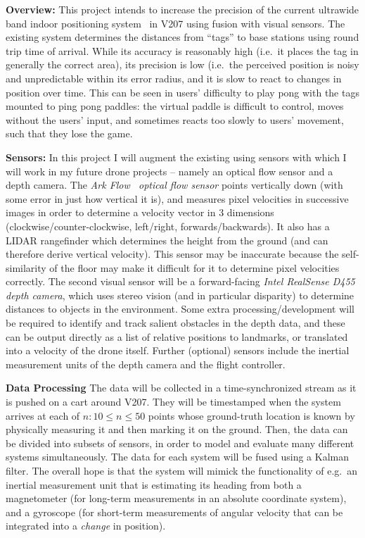 \textbf{Overview:}
This project intends to increase the precision of the current ultrawide band indoor positioning system~\cite{decawave_product_brief}
in V207 using fusion with visual sensors.
The existing system determines the distances from ``tags'' to base stations using round trip
time of arrival.
While its accuracy is reasonably high (i.e.~it places the tag in generally the correct area),
its precision is low (i.e.~the perceived position is noisy and unpredictable within its error radius,
and it is slow to react to changes in position over time.
This can be seen in users' difficulty to play pong with the tags mounted to ping pong paddles:
the virtual paddle is difficult to control, moves without the users' input,
and sometimes reacts too slowly to users' movement,
such that they lose the game.

\textbf{Sensors:}
In this project I will augment the existing using sensors with which I will work in my future drone
projects -- namely an optical flow sensor and a depth camera.
The \emph{Ark Flow~\cite{arkflow} optical flow sensor} points vertically down
(with some error in just how vertical it is),
and measures pixel velocities in successive images in order to determine a velocity vector in 3
dimensions (clockwise/counter-clockwise, left/right, forwards/backwards).
It also has a LIDAR rangefinder which determines the height from the ground
(and can therefore derive vertical velocity).
This sensor may be inaccurate because the self-similarity of the floor may make it difficult
for it to determine pixel velocities correctly.
The second visual sensor will be a forward-facing \emph{Intel RealSense D455 depth camera},
which uses stereo vision (and in particular disparity) to determine distances to objects
in the environment.
Some extra processing/development will be required to identify and track salient obstacles in the
depth data, and these can be output directly as a list of relative positions to landmarks,
or translated into a velocity of the drone itself.
Further (optional) sensors include the inertial measurement units
of the depth camera and the flight controller.

\textbf{Data Processing}
The data will be collected in a time-synchronized stream as it is pushed on a cart around V207.
They will be timestamped when the system arrives at each of $n: 10 \leq n \leq 50$ points
whose ground-truth location is known by physically measuring it and then marking it on the ground.
Then, the data can be divided into subsets of sensors, in order to model and evaluate many different
systems simultaneously.
The data for each system will be fused using a Kalman filter.
The overall hope is that the system will mimick the functionality of
e.g.~an inertial measurement unit that is estimating its heading
from both a magnetometer (for long-term measurements in an absolute coordinate system),
and a gyroscope (for short-term measurements of angular velocity that can be integrated into a \emph{change} in position).

